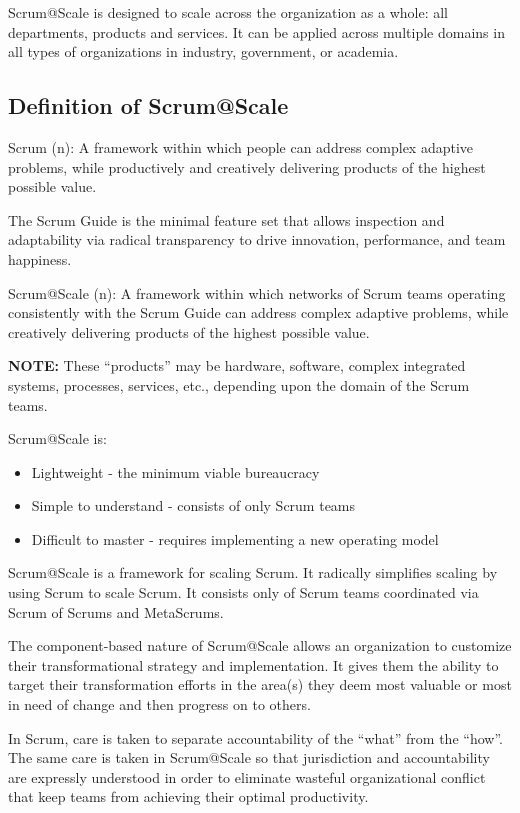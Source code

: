 \documentclass[12pt,a4paper,parskip=full]{scrartcl}
\begin{document}
Scrum@Scale is designed to scale across the organization as a whole: all
departments, products and services. It can be applied across multiple
domains in all types of organizations in industry, government, or academia.

\subsection{Definition of Scrum@Scale}
Scrum (n): A framework within which people can address complex adaptive
problems, while productively and creatively delivering products of the
highest possible value.

The Scrum Guide is the minimal feature set that allows inspection and
adaptability via radical transparency to drive innovation, performance, and
team happiness.

Scrum@Scale (n): A framework within which networks of Scrum teams operating
consistently with the Scrum Guide can address complex adaptive problems,
while creatively delivering products of the highest possible value.

\textbf{NOTE:} These ``products'' may be hardware, software, complex
integrated systems, processes, services, etc., depending upon the domain of
the Scrum teams.

Scrum@Scale is:
\begin{itemize}
\item Lightweight - the minimum viable bureaucracy
\item Simple to understand - consists of only Scrum teams
\item Difficult to master - requires implementing a new operating model
\end{itemize}


Scrum@Scale is a framework for scaling Scrum. It radically simplifies
scaling by using Scrum to scale Scrum. It consists only of Scrum teams
coordinated via Scrum of Scrums and MetaScrums.

The component-based nature of Scrum@Scale allows an organization to
customize their transformational strategy and implementation. It gives them
the ability to target their transformation efforts in the area(s) they deem
most valuable or most in need of change and then progress on to others.

In Scrum, care is taken to separate accountability of the ``what'' from the
``how''. The same care is taken in Scrum@Scale so that jurisdiction and
accountability are expressly understood in order to eliminate wasteful
organizational conflict that keep teams from achieving their optimal
productivity.
\end{document}
